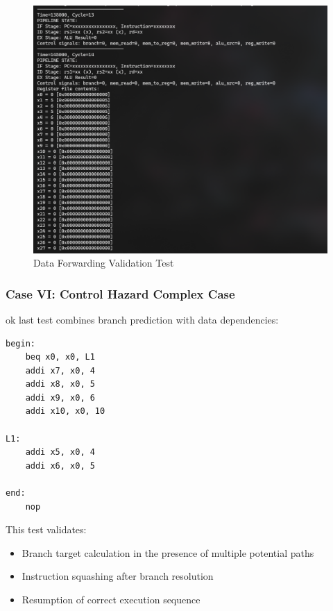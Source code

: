 \documentclass{article}
\numberwithin{figure}{section}
\numberwithin{table}{section}
\begin{document}
\begin{figure}[H]
    \centering
    \includegraphics[width=0.95\linewidth]{pipe_test6.png}
    \caption{Data Forwarding Validation Test}
    \label{fig:pipe-test6}
\end{figure}

\subsubsection{Case VI: Control Hazard Complex Case}

ok last test combines branch prediction with data dependencies:

\begin{lstlisting}[style=verilog-style]
begin:
    beq x0, x0, L1
    addi x7, x0, 4
    addi x8, x0, 5
    addi x9, x0, 6
    addi x10, x0, 10

L1:
    addi x5, x0, 4
    addi x6, x0, 5

end:
    nop
\end{lstlisting}

This test validates:
\begin{itemize}
    \item Branch target calculation in the presence of multiple potential paths
    \item Instruction squashing after branch resolution
    \item Resumption of correct execution sequence
\end{itemize}
\end{document}
